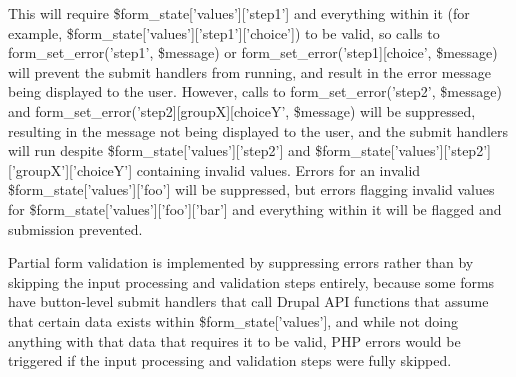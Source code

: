 This will require \$form\_\-state\mbox{[}'values'\mbox{]}\mbox{[}'step1'\mbox{]} and everything within it (for example, \$form\_\-state\mbox{[}'values'\mbox{]}\mbox{[}'step1'\mbox{]}\mbox{[}'choice'\mbox{]}) to be valid, so calls to form\_\-set\_\-error('step1', \$message) or form\_\-set\_\-error('step1\mbox{]}\mbox{[}choice', \$message) will prevent the submit handlers from running, and result in the error message being displayed to the user. However, calls to form\_\-set\_\-error('step2', \$message) and form\_\-set\_\-error('step2\mbox{]}\mbox{[}groupX\mbox{]}\mbox{[}choiceY', \$message) will be suppressed, resulting in the message not being displayed to the user, and the submit handlers will run despite \$form\_\-state\mbox{[}'values'\mbox{]}\mbox{[}'step2'\mbox{]} and \$form\_\-state\mbox{[}'values'\mbox{]}\mbox{[}'step2'\mbox{]}\mbox{[}'groupX'\mbox{]}\mbox{[}'choiceY'\mbox{]} containing invalid values. Errors for an invalid \$form\_\-state\mbox{[}'values'\mbox{]}\mbox{[}'foo'\mbox{]} will be suppressed, but errors flagging invalid values for \$form\_\-state\mbox{[}'values'\mbox{]}\mbox{[}'foo'\mbox{]}\mbox{[}'bar'\mbox{]} and everything within it will be flagged and submission prevented.

Partial form validation is implemented by suppressing errors rather than by skipping the input processing and validation steps entirely, because some forms have button-\/level submit handlers that call Drupal API functions that assume that certain data exists within \$form\_\-state\mbox{[}'values'\mbox{]}, and while not doing anything with that data that requires it to be valid, PHP errors would be triggered if the input processing and validation steps were fully skipped.


